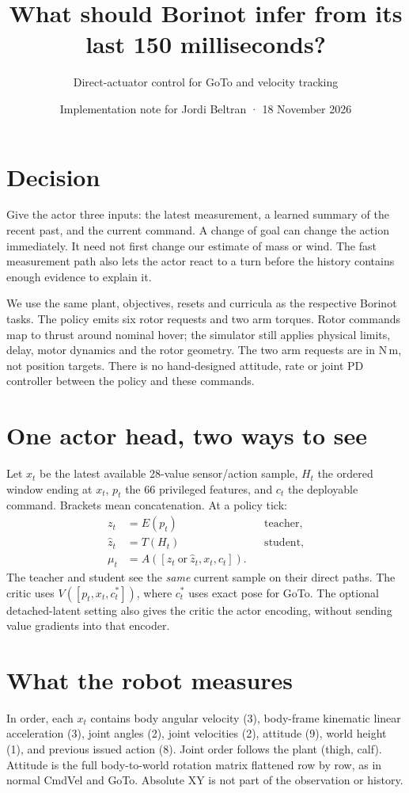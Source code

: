 \documentclass[10pt,a4paper,twocolumn]{article}
\title{What should Borinot infer from its last 150 milliseconds?}
\author{Direct-actuator control for GoTo and velocity tracking}
\date{Implementation note for Jordi Beltran · 18 November 2026}
\begin{document}
\maketitle
\section*{Decision}
Give the actor three inputs: the latest measurement, a learned summary of the recent past, and the current command. A change of goal can change the action immediately. It need not first change our estimate of mass or wind. The fast measurement path also lets the actor react to a turn before the history contains enough evidence to explain it.

We use the same plant, objectives, resets and curricula as the respective Borinot tasks. The policy emits six rotor requests and two arm torques. Rotor commands map to thrust around nominal hover; the simulator still applies physical limits, delay, motor dynamics and the rotor geometry. The two arm requests are in N\,m, not position targets. There is no hand-designed attitude, rate or joint PD controller between the policy and these commands.

\section*{One actor head, two ways to see}
Let $x_t$ be the latest available 28-value sensor/action sample, $H_t$ the ordered window ending at $x_t$, $p_t$ the 66 privileged features, and $c_t$ the deployable command. Brackets mean concatenation. At a policy tick:
\begin{align}
z_t &= E(p_t) &&\text{teacher},\\
\hat z_t &= T(H_t) &&\text{student},\\
\mu_t &= A([z_t\ \text{or}\ \hat z_t, x_t,c_t]). &&
\end{align}
The teacher and student see the \emph{same} current sample on their direct paths. The critic uses $V([p_t,x_t,c_t^*])$, where $c_t^*$ uses exact pose for GoTo. The optional detached-latent setting also gives the critic the actor encoding, without sending value gradients into that encoder.

\section*{What the robot measures}
In order, each $x_t$ contains body angular velocity (3), body-frame kinematic linear acceleration (3), joint angles (2), joint velocities (2), attitude (9), world height (1), and previous issued action (8). Joint order follows the plant (thigh, calf). Attitude is the full body-to-world rotation matrix flattened row by row, as in normal CmdVel and GoTo. Absolute XY is not part of the observation or history.
\end{document}
